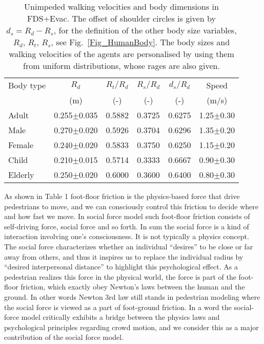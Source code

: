\documentclass{article}
\begin{document}
%
%
%
\begin{table}[b!]
\begin{center}
\caption{Unimpeded walking velocities and body dimensions in FDS+Evac.
   The offset of shoulder circles is given by $d_s = R_d - R_s$, for the
   definition of the other body size variables, $R_d$, $R_t$, $R_s$,
   see Fig.~\protect\ref{Fig_HumanBody}.  The body sizes and walking
   velocities of the agents are personalised by using them from uniform
   distributions, whose rages are also given.}\label{Table_DefaultHumans}
\vspace{12pt}
\begin{tabular}{l c c c c c}\hline\hline
Body type & $R_d$& $R_t/R_d$ & $R_s/R_d$  & $d_s/R_d$ & Speed \\
          & (m)  & (-)   &  (-)    & (-)    & (m/s) \\ \hline
Adult     & 0.255$\pm$0.035 & 0.5882 & 0.3725 & 0.6275 &
          1.25$\pm$0.30 \\  %
Male      & 0.270$\pm$0.020 & 0.5926 & 0.3704 & 0.6296 &
          1.35$\pm$0.20 \\  %
Female    & 0.240$\pm$0.020 & 0.5833 & 0.3750 & 0.6250 &
          1.15$\pm$0.20 \\  %
Child     & 0.210$\pm$0.015 & 0.5714 & 0.3333 & 0.6667 &
          0.90$\pm$0.30 \\  %
Elderly   & 0.250$\pm$0.020 & 0.6000 & 0.3600 & 0.6400 &
          0.80$\pm$0.30 \\ \hline\hline  %
\end{tabular}
\end{center}
\end{table}
%


As shown in Table 1 foot-floor friction is the physics-based force that drive pedestrians to move, and we can consciously control this friction to decide where and how fast we move.  In social force model such foot-floor friction consists of self-driving force, social force and so forth.  In sum the social force is a kind of interaction involving one's consciousness.  It is not typically a physics concept.  The social force characterizes whether an individual “desires” to be close or far away from others, and thus it inspires us to replace the individual radius by “desired interpersonal distance” to highlight this psychological effect.   As a pedestrian realizes this force in the physical world, the force is part of the foot-floor friction, which exactly obey Newton's laws between the human and the ground.  In other words Newton 3rd law still stands in pedestrian modeling where the social force is viewed as a part of foot-ground friction.  In a word the social-force model critically exhibits a bridge between the physics laws and psychological principles regarding crowd motion, and we consider this as a major contribution of the social force model.
\end{document}
